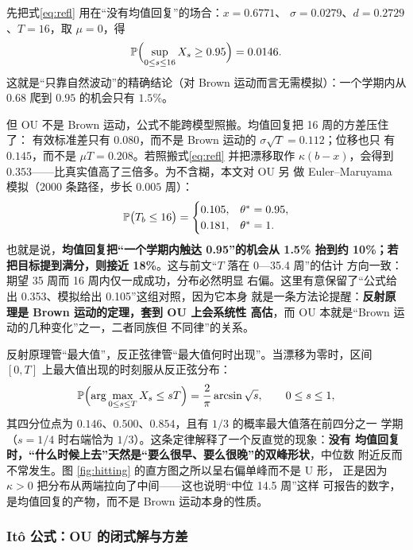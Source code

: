 先把式\eqref{eq:refl} 用在“没有均值回复”的场合：$x=0.6771$、
$\sigma=0.0279$、$d=0.2729$、$T=16$，取 $\mu=0$，得
\begin{equation}
\mathbb{P}\Bigl(\sup_{0\le s\le16}X_s\ge0.95\Bigr)=0.0146 .
\label{eq:purebm}
\end{equation}
这就是“只靠自然波动”的精确结论（对 Brown 运动而言无需模拟）：一个学期内从
$0.68$ 爬到 $0.95$ 的机会只有 $1.5\%$。

但 OU 不是 Brown 运动，公式不能跨模型照搬。均值回复把 16 周的方差压住了：
有效标准差只有 $0.080$，而不是 Brown 运动的 $\sigma\sqrt{T}=0.112$；位移也只
有 $0.145$，而不是 $\mu T=0.208$。若照搬式\eqref{eq:refl} 并把漂移取作
$\kappa(b-x)$，会得到 $0.353$——比真实值高了三倍多。为不含糊，本文对 OU 另
做 Euler--Maruyama 模拟（$2000$ 条路径，步长 $0.005$ 周）：
\begin{equation}
\mathbb{P}\bigl(T_b\le16\bigr)=
\begin{cases}
0.105, & \theta^{*}=0.95,\\
0.181, & \theta^{*}=1 .
\end{cases}
\label{eq:oumc}
\end{equation}
也就是说，\textbf{均值回复把“一个学期内触达 0.95”的机会从 1.5\% 抬到约
10\%；若把目标提到满分，则接近 18\%}。这与前文“$T$ 落在 0—35.4 周”的估计
方向一致：期望 35 周而 16 周内仅一成成功，分布必然明显
右偏。这里有意保留了“公式给出 0.353、模拟给出 0.105”这组对照，因为它本身
就是一条方法论提醒：\textbf{反射原理是 Brown 运动的定理，套到 OU 上会系统性
高估}，而 OU 本就是“Brown 运动的几种变化”之一，二者同族但
不同律”的关系。

反射原理管“最大值”，反正弦律管“最大值何时出现”。当漂移为零时，区间
$[0,T]$ 上最大值出现的时刻服从反正弦分布：
\begin{equation}
\mathbb{P}\Bigl(\arg\max_{0\le s\le T}X_s\le sT\Bigr)
=\frac{2}{\pi}\arcsin\sqrt{s},\qquad 0\le s\le1,
\label{eq:arcsine}
\end{equation}
其四分位点为 $0.146$、$0.500$、$0.854$，且有 $1/3$ 的概率最大值落在前四分之一
学期（$s=1/4$ 时右端恰为 $1/3$）。这条定律解释了一个反直觉的现象：\textbf{没有
均值回复时，“什么时候上去”天然是“要么很早、要么很晚”的双峰形状}，中位数
附近反而不常发生。图 \ref{fig:hitting} 的直方图之所以呈右偏单峰而不是 U 形，
正是因为 $\kappa>0$ 把分布从两端拉向了中间——这也说明“中位 14.5 周”这样
可报告的数字，是均值回复的产物，而不是 Brown 运动本身的性质。

\subsubsection{Itô 公式：OU 的闭式解与方差}

